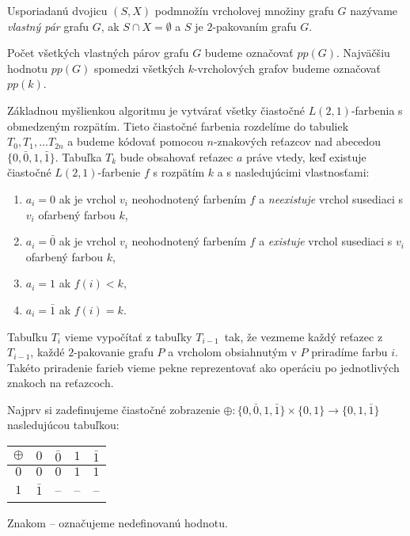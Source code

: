 \begin{defn}
    Usporiadanú dvojicu $(S, X)$ podmnožín vrcholovej množiny grafu $G$ nazývame \emph{vlastný pár}
    grafu $G$, ak $S \cap X = \emptyset$ a $S$ je $2$-pakovaním grafu $G$.

    Počet všetkých vlastných párov grafu $G$ budeme označovať $pp(G)$. Najväčšiu hodnotu $pp(G)$
    spomedzi všetkých $k$-vrcholových grafov budeme označovať $pp(k)$.
\end{defn}

Základnou myšlienkou algoritmu je vytvárať všetky čiastočné $L(2,1)$-farbenia s obmedzeným rozpätím.
Tieto čiastočné farbenia rozdelíme do tabuliek $T_0, T_1, \ldots T_{2n}$ a budeme kódovať pomocou
$n$-znakových reťazcov nad abecedou $\{0, \bar{0}, 1, \bar{1}\}$. Tabuľka $T_k$ bude obsahovať
reťazec $a$ práve vtedy, keď existuje čiastočné $L(2,1)$-farbenie $f$ s rozpätím $k$ a s nasledujúcimi vlastnosťami:

\begin{enumerate}
    \item $a_i = 0$ ak je vrchol $v_i$ neohodnotený farbením $f$ a \emph{neexistuje} vrchol susediaci s $v_i$ ofarbený farbou $k$,
    \item $a_i = \bar{0}$ ak je vrchol $v_i$ neohodnotený farbením $f$ a \emph{existuje} vrchol susediaci s $v_i$ ofarbený farbou $k$,
    \item $a_i = 1$ ak $f(i) < k$,
    \item $a_i = \bar{1}$ ak $f(i) = k$.
\end{enumerate}

Tabuľku $T_i$ vieme vypočítať z tabuľky $T_{i-1}$ tak, že vezmeme každý reťazec z $T_{i-1}$, každé
$2$-pakovanie grafu $P$ a vrcholom obsiahnutým v $P$ priradíme farbu $i$. Takéto priradenie farieb
vieme pekne reprezentovať ako operáciu po jednotlivých znakoch na reťazcoch.

Najprv si zadefinujeme čiastočné zobrazenie $\oplus : \{ 0, \bar{0}, 1, \bar{1}\} \times \{ 0, 1 \} \rightarrow \{0, 1, \bar{1}\}$
nasledujúcou tabuľkou:

\begin{tabular}{c | c c c c}
    $\oplus$ & $0$ & $\bar{0}$ & $1$ & $\bar{1}$ \\
    \hline
    $0$ & $0$ & $0$ & $1$ & $1$ \\
    $1$ & $\bar{1}$ & -- & -- & -- \\
\end{tabular}

Znakom -- označujeme nedefinovanú hodnotu.

